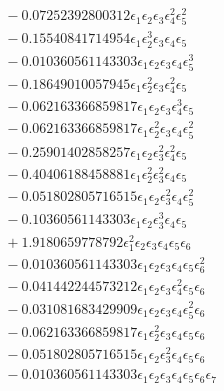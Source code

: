 \documentclass[10pt]{article}
\begin{document}
\begin{align*}
&{}  - 0.07252392800312 \epsilon_{1} \epsilon_{2} \epsilon_{3} \epsilon_{4}^{2} \epsilon_{5}^{2} \\
&{}  - 0.15540841714954 \epsilon_{1} \epsilon_{2}^{3} \epsilon_{3} \epsilon_{4} \epsilon_{5} \\
&{}  - 0.010360561143303 \epsilon_{1} \epsilon_{2} \epsilon_{3} \epsilon_{4} \epsilon_{5}^{3} \\
&{}  - 0.18649010057945 \epsilon_{1} \epsilon_{2}^{2} \epsilon_{3} \epsilon_{4}^{2} \epsilon_{5} \\
&{}  - 0.062163366859817 \epsilon_{1} \epsilon_{2} \epsilon_{3} \epsilon_{4}^{3} \epsilon_{5} \\
&{}  - 0.062163366859817 \epsilon_{1} \epsilon_{2}^{2} \epsilon_{3} \epsilon_{4} \epsilon_{5}^{2} \\
&{}  - 0.25901402858257 \epsilon_{1} \epsilon_{2} \epsilon_{3}^{2} \epsilon_{4}^{2} \epsilon_{5} \\
&{}  - 0.40406188458881 \epsilon_{1} \epsilon_{2}^{2} \epsilon_{3}^{2} \epsilon_{4} \epsilon_{5} \\
&{}  - 0.051802805716515 \epsilon_{1} \epsilon_{2} \epsilon_{3}^{2} \epsilon_{4} \epsilon_{5}^{2} \\
&{}  - 0.10360561143303 \epsilon_{1} \epsilon_{2} \epsilon_{3}^{3} \epsilon_{4} \epsilon_{5} \\
&{}  + 1.9180659778792 \epsilon_{1}^{2} \epsilon_{2} \epsilon_{3} \epsilon_{4} \epsilon_{5} \epsilon_{6} \\
&{}  - 0.010360561143303 \epsilon_{1} \epsilon_{2} \epsilon_{3} \epsilon_{4} \epsilon_{5} \epsilon_{6}^{2} \\
&{}  - 0.041442244573212 \epsilon_{1} \epsilon_{2} \epsilon_{3} \epsilon_{4}^{2} \epsilon_{5} \epsilon_{6} \\
&{}  - 0.031081683429909 \epsilon_{1} \epsilon_{2} \epsilon_{3} \epsilon_{4} \epsilon_{5}^{2} \epsilon_{6} \\
&{}  - 0.062163366859817 \epsilon_{1} \epsilon_{2}^{2} \epsilon_{3} \epsilon_{4} \epsilon_{5} \epsilon_{6} \\
&{}  - 0.051802805716515 \epsilon_{1} \epsilon_{2} \epsilon_{3}^{2} \epsilon_{4} \epsilon_{5} \epsilon_{6} \\
&{}  - 0.010360561143303 \epsilon_{1} \epsilon_{2} \epsilon_{3} \epsilon_{4} \epsilon_{5} \epsilon_{6} \epsilon_{7}
\end{align*}
\end{document}
